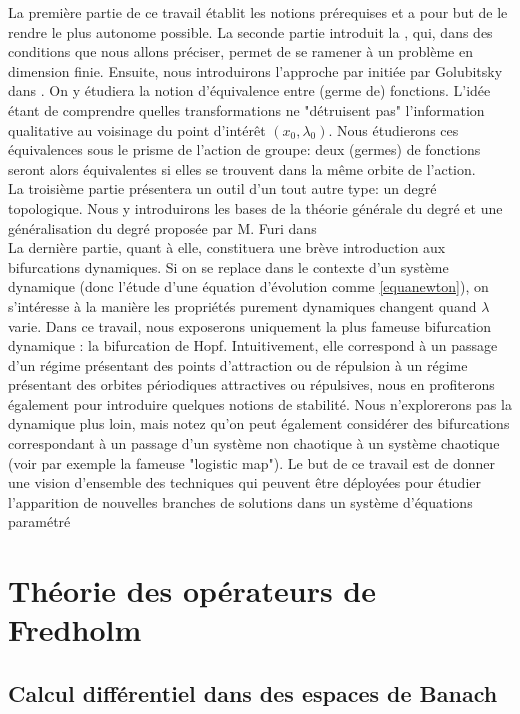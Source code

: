 \documentclass[memoire.tex]{subfiles}
\begin{document}
 La première partie de ce travail établit les notions prérequises et a pour but de le rendre le plus autonome possible. La seconde partie introduit la , qui,  dans des conditions que nous allons préciser, permet de se ramener à un problème en dimension finie. Ensuite, nous introduirons l'approche par  initiée par Golubitsky dans \cite{golubitsky1985sgb1}. On y étudiera la notion d'équivalence entre (germe de) fonctions. L'idée étant de comprendre quelles transformations ne "détruisent pas" l'information qualitative au voisinage du point d'intérêt $(x_0,\lambda_0)$. Nous étudierons ces équivalences sous le prisme de l'action de groupe: deux (germes) de fonctions seront alors équivalentes si elles se trouvent dans la même orbite de l'action.\\
 La troisième partie présentera un outil d'un tout autre type: un degré topologique. Nous y introduirons les bases de la théorie générale du degré et une généralisation du degré proposée par M. Furi dans \cite{BenevieriFuri2001} \\
 La dernière partie, quant à elle, constituera une brève introduction aux bifurcations dynamiques. Si on se replace dans le contexte d'un système dynamique (donc l'étude d'une équation d'évolution comme  \eqref{equanewton}), on s'intéresse à la manière les propriétés purement dynamiques changent quand $\lambda$ varie. Dans ce travail, nous exposerons uniquement la plus fameuse bifurcation dynamique : la bifurcation de Hopf. Intuitivement, elle correspond à un passage d'un régime présentant des  points d'attraction ou de répulsion à un régime présentant des orbites périodiques attractives ou répulsives, nous en profiterons également pour introduire quelques notions de stabilité. Nous n'explorerons pas la dynamique plus loin, mais notez qu'on peut également considérer des bifurcations correspondant à un passage d'un système non chaotique à un système chaotique (voir par exemple la fameuse "logistic map"). Le but de ce travail est de donner une vision d'ensemble des techniques qui peuvent être déployées pour étudier l'apparition de nouvelles branches de solutions dans un système d'équations paramétré
 
\newpage
\section{Théorie des opérateurs de Fredholm}


\subsection{Calcul différentiel dans des espaces de Banach}
\end{document}
